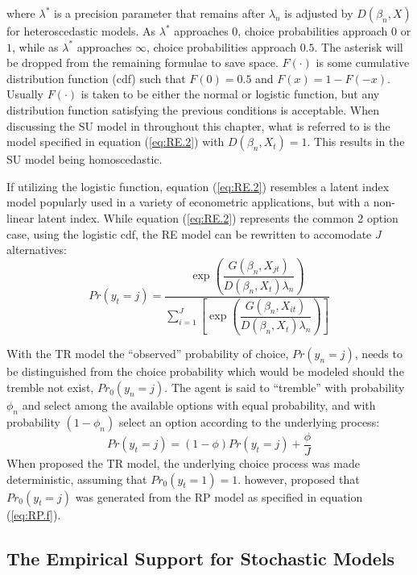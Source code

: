 \documentclass[11pt,a4paper]{article}
\newcommand\Prob{\ensuremath{\mathit{Pr}}}  %
\begin{document}
\noindent where $\lambda^*$ is a precision parameter that remains after $\lambda_n$ is adjusted by $D(\beta_n,X)$ for heteroscedastic models.
As $\lambda^*$ approaches $0$, choice probabilities approach $0$ or $1$, while as $\lambda^*$ approaches $\infty$, choice probabilities approach $0.5$.
The asterisk will be dropped from the remaining formulae to save space.
$F(\cdot)$ is some cumulative distribution function (cdf) such that $F(0) = 0.5$ and $F(x) = 1 - F(-x)$.
Usually $F(\cdot)$ is taken to be either the normal or logistic function, but any distribution function satisfying the previous conditions is acceptable.
When discussing the SU model in throughout this chapter, what is referred to is the model specified in equation (\ref{eq:RE.2}) with $D(\beta_n,X_t) = 1$.
This results in the SU model being homoscedastic.

If utilizing the logistic function, equation (\ref{eq:RE.2}) resembles a latent index model popularly used in a variety of econometric applications, but with a non-linear latent index.
While equation (\ref{eq:RE.2}) represents the common 2 option case, using the logistic cdf, the RE model can be rewritten to accomodate $J$ alternatives:
\begin{equation}
	\label{eq:RE.f}
	{\Prob}(y_t=j) =\dfrac{\exp\!\left( \dfrac{ G(\beta_n,X_{jt}) }{ D(\beta_n,X_{t})\lambda_n }  \right)}{ \displaystyle\sum_{i=1}^J \left[ \exp\!\left( \dfrac{ G(\beta_n,X_{it}) }{ D(\beta_n,X_{t})\lambda_n }  \right)  \right]  } 
\end{equation}

With the TR model the \enquote{observed} probability of choice, ${\Prob}(y_n=j)$, needs to be distinguished from the choice probability which would be modeled should the tremble not exist, ${\Prob}_0(y_n=j)$.
The agent is said to \enquote{tremble} with probability $\phi_n$ and select among the available options with equal probability, and with probability $(1-\phi_n)$ select an option according to the underlying process:
\begin{equation}
	\label{eq:TR.f}
	{\Prob}(y_t=j) = (1-\phi) {\Prob}(y_t=j) + \frac{\phi}{J}
\end{equation}
When \textcite{Harless1994} proposed the TR model, the underlying choice process was made deterministic, assuming that ${\Prob}_0(y_t=1) = 1$.
\textcite{Loomes2002} however, proposed that ${\Prob}_0(y_t=j)$ was generated from the RP model as specified in equation (\ref{eq:RP.f}).

\subsection{The Empirical Support for Stochastic Models}
\end{document}
